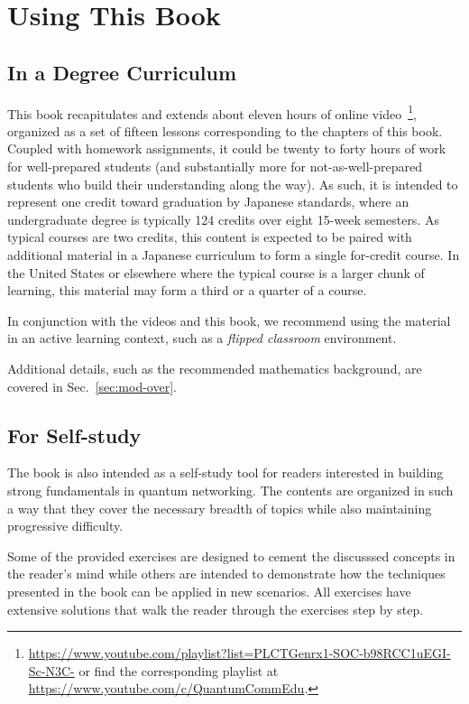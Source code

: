 \chapter*{Using This Book}

\section*{In a Degree Curriculum}

This book recapitulates and extends about eleven hours of online video~\footnote{\url{https://www.youtube.com/playlist?list=PLCTGenrx1-SOC-b98RCC1uEGI-Sc-N3C-} or find the corresponding playlist at \url{https://www.youtube.com/c/QuantumCommEdu}.}, organized as a set of fifteen lessons corresponding to the chapters of this book. Coupled with homework assignments, it could be twenty to forty hours of work for well-prepared students (and substantially more for not-as-well-prepared students who build their understanding along the way).  As such, it is intended to represent one credit toward graduation by Japanese standards, where an undergraduate degree is typically 124 credits over eight 15-week semesters. As typical courses are two credits, this content is expected to be paired with additional material in a Japanese curriculum to form a single for-credit course. In the United States or elsewhere where the typical course is a larger chunk of learning, this material may form a third or a quarter of a course.

In conjunction with the videos and this book, we recommend using the material in an active learning context, such as a \emph{flipped classroom} environment.

Additional details, such as the recommended mathematics background, are covered in Sec.~\ref{sec:mod-over}.

\section*{For Self-study}

The book is also intended as a self-study tool for readers interested in building strong fundamentals in quantum networking. The contents are organized in such a way that they cover the necessary breadth of topics while also maintaining progressive difficulty.

Some of the provided exercises are designed to cement the discusssed concepts in the reader's mind while others are intended to demonstrate how the techniques presented in the book can be applied in new scenarios. All exercises have extensive solutions that walk the reader through the exercises step by step.

